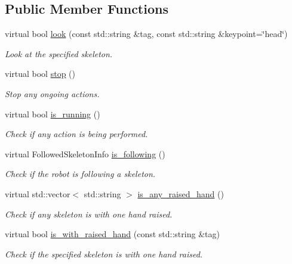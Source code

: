 \subsection*{Public Member Functions}
\begin{DoxyCompactItemize}
\item 
virtual bool \hyperlink{classattentionManager__IDL_a42941cc508bb57aa390578ecdbfde7c2}{look} (const std\+::string \&tag, const std\+::string \&keypoint=\char`\"{}head\char`\"{})
\begin{DoxyCompactList}\small\item\em Look at the specified skeleton. \end{DoxyCompactList}\item 
virtual bool \hyperlink{classattentionManager__IDL_aa5e3fb18a0336d8b65c316e7f6a675a8}{stop} ()
\begin{DoxyCompactList}\small\item\em Stop any ongoing actions. \end{DoxyCompactList}\item 
virtual bool \hyperlink{classattentionManager__IDL_ada750e5a7c6a0bb99be495e24d34dcdd}{is\+\_\+running} ()
\begin{DoxyCompactList}\small\item\em Check if any action is being performed. \end{DoxyCompactList}\item 
virtual Followed\+Skeleton\+Info \hyperlink{classattentionManager__IDL_a03b844a8bd3d6e2b4cf5ba88ace27429}{is\+\_\+following} ()
\begin{DoxyCompactList}\small\item\em Check if the robot is following a skeleton. \end{DoxyCompactList}\item 
virtual std\+::vector$<$ std\+::string $>$ \hyperlink{classattentionManager__IDL_ad0b7882cea4dd8b0269cd3eaf0f5dbae}{is\+\_\+any\+\_\+raised\+\_\+hand} ()
\begin{DoxyCompactList}\small\item\em Check if any skeleton is with one hand raised. \end{DoxyCompactList}\item 
virtual bool \hyperlink{classattentionManager__IDL_aa6b2c971be0e878ab259675c83bba2dc}{is\+\_\+with\+\_\+raised\+\_\+hand} (const std\+::string \&tag)
\begin{DoxyCompactList}\small\item\em Check if the specified skeleton is with one hand raised. \end{DoxyCompactList}\item 

\end{DoxyCompactItemize}
